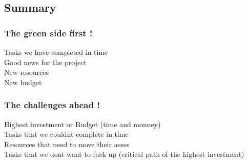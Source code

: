 \documentclass[8pt]{article} %
\begin{document}
\subsection{Summary}

%
%

%

%

%

%

%

\subsubsection{The green side first !}
Tasks we have completed in time\\
Good news for the project\\
New resources\\
New budget\\

\subsubsection{The challenges ahead !}
Highest investment or Budget (time and monney)\\
Tasks that we couldnt complete in time\\
Resources that need to move their asses\\
Tasks that we dont want to fuck up (critical path of the highest investment)\\
\end{document}
